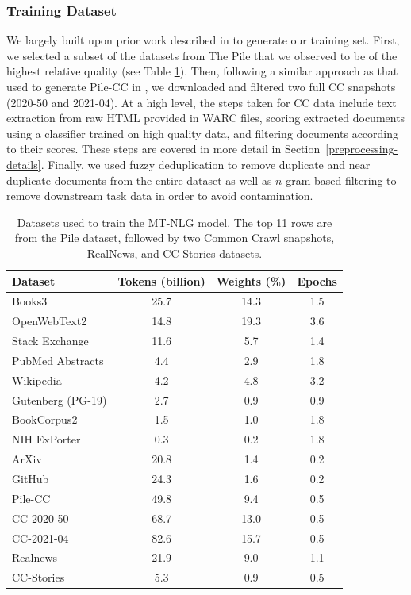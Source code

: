 \documentclass[11pt]{article}
\begin{document}
\subsubsection{Training Dataset}
We largely built upon prior work described in \citep{brown2020language,pile-dataset-2020} to generate our training set. First, we selected a subset of the datasets from The Pile that we observed to be of the highest relative quality (see Table \ref{tab:datasets-530b}). Then, following a similar approach as that used to generate Pile-CC in \citep{pile-dataset-2020}, we downloaded and filtered two full CC snapshots (2020-50 and 2021-04). At a high level, the steps taken for CC data include text extraction from raw HTML provided in WARC files, scoring extracted documents using a classifier trained on high quality data, and filtering documents according to their scores. These steps are covered in more detail in Section~\ref{preprocessing-details}. Finally, we used fuzzy deduplication to remove duplicate and near duplicate documents from the entire dataset as well as $n$-gram based filtering to remove downstream task data in order to avoid contamination.

\begin{table}[t]
\centering
\small
\begin{tabular}{l c c c}
 \toprule
 \textbf{Dataset} &  \textbf{Tokens (billion)}  &  \textbf{Weights (\%)} &  \textbf{Epochs} \\
 \midrule
 Books3	&	25.7	&	14.3	&	1.5	\\
 OpenWebText2	&	14.8	&	19.3	&	3.6	\\
 Stack Exchange	&	11.6	&	5.7	&	1.4	\\
 PubMed Abstracts	&	4.4	&	2.9	&	1.8	\\
 Wikipedia	&	4.2	&	4.8	&	3.2	\\
 Gutenberg (PG-19)	&	2.7	&	0.9	&	0.9	\\
 BookCorpus2	&	1.5	&	1.0	&	1.8	\\
 NIH ExPorter	&	0.3	&	0.2	&	1.8	\\
 ArXiv	&	20.8	&	1.4	&	0.2	\\
 GitHub	&	24.3	&	1.6	&	0.2 \\
 Pile-CC	&	49.8	&	9.4	&	0.5	\\
 \midrule
 CC-2020-50	&	68.7	&	13.0	&	0.5	\\
 CC-2021-04	&	82.6	&	15.7	&	0.5	\\
 \midrule
 Realnews	&	21.9	&	9.0	&	1.1	\\
 CC-Stories	&	5.3	&	0.9	&	0.5	\\
 \bottomrule
\end{tabular}
\caption{Datasets used to train the MT-NLG model. The top 11 rows are from the Pile dataset, followed by two Common Crawl snapshots, RealNews, and CC-Stories datasets.}
\label{tab:datasets-530b}
\end{table}
\end{document}
